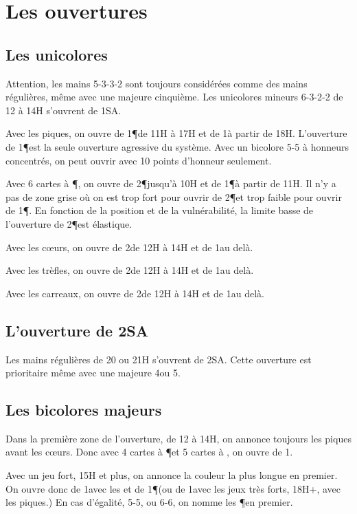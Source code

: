 \chapter{Les ouvertures}

\begin{multicols}{2}


\section*{Les  unicolores}


Attention, les mains 5-3-3-2 sont toujours considérées comme des mains régulières, même avec une majeure cinquième.
Les unicolores mineurs 6-3-2-2 de 12 à 14H s'ouvrent de 1SA.

Avec les piques, on ouvre de 1\P de 11H à 17H et de 1\K à partir de 18H. L'ouverture de 1\P est la seule ouverture agressive du système.
Avec un bicolore 5-5 à honneurs concentrés, on peut ouvrir avec 10 points d'honneur seulement.

Avec 6 cartes à \P, on ouvre de 2\P jusqu'à 10H et de 1\P à partir de  11H. Il n'y a pas de zone grise où on est trop fort pour ouvrir de 2\P et trop faible pour ouvrir de 1\P. En fonction de la position et de la vulnérabilité, la limite basse de l'ouverture de 2\P est élastique.

Avec les cœurs, on ouvre de 2\C de 12H à 14H et de 1\T au delà.

Avec les trèfles, on ouvre de 2\T de 12H à 14H et de 1\C au delà.


Avec les carreaux, on ouvre de 2\K de 12H à 14H et de 1\C au delà.

\section*{L'ouverture de 2SA}

Les mains régulières de 20 ou 21H s'ouvrent de 2SA. Cette ouverture est prioritaire même avec une majeure 4\ieme ou 5\ieme.

\section*{Les bicolores majeurs}

Dans la première zone de l'ouverture, de 12 à 14H, on annonce toujours les piques avant les cœurs. Donc avec 4 cartes à \P et 5 cartes à \C, on ouvre de 1\K.

Avec un jeu fort, 15H et plus, on annonce la couleur la plus longue en premier. On ouvre donc de 1\T avec les \C et de 1\P (ou de 1\K avec les jeux très forts, 18H+, avec les piques.)
En cas d'égalité, 5-5, ou 6-6, on nomme les \P en premier.


\end{multicols}
